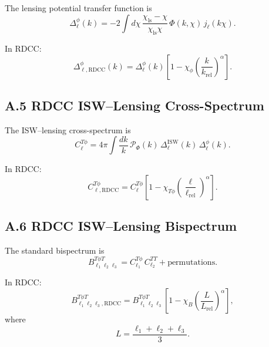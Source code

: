 \documentclass[11pt,a4paper]{article}
\begin{document}
The lensing potential transfer function is
\begin{equation}
    \Delta_{\ell}^{\phi}(k)
    = -2 \int d\chi\,
      \frac{\chi_{\mathrm{ls}}-\chi}{\chi_{\mathrm{ls}}\chi}\,
      \Phi(k,\chi)\,
      j_{\ell}(k\chi).
\end{equation}

In RDCC:
\begin{equation}
    \Delta_{\ell,\mathrm{RDCC}}^{\phi}(k)
    = \Delta_{\ell}^{\phi}(k)
      \left[
        1 - \chi_{\phi}
        \left(\frac{k}{k_{\mathrm{rel}}}\right)^{\alpha}
      \right].
\end{equation}

\subsection*{A.5 RDCC ISW–Lensing Cross-Spectrum}

The ISW–lensing cross-spectrum is
\begin{equation}
    C_{\ell}^{T\phi}
    = 4\pi \int \frac{dk}{k}\,
      \mathcal{P}_{\Phi}(k)\,
      \Delta_{\ell}^{\mathrm{ISW}}(k)\,
      \Delta_{\ell}^{\phi}(k).
\end{equation}

In RDCC:
\begin{equation}
    C_{\ell,\mathrm{RDCC}}^{T\phi}
    = C_{\ell}^{T\phi}
      \left[
        1 - \chi_{T\phi}
        \left(\frac{\ell}{\ell_{\mathrm{rel}}}\right)^{\alpha}
      \right].
\end{equation}

\subsection*{A.6 RDCC ISW–Lensing Bispectrum}

The standard bispectrum is
\begin{equation}
    B_{\ell_{1}\ell_{2}\ell_{3}}^{T\phi T}
    = C_{\ell_{1}}^{T\phi}\,C_{\ell_{2}}^{TT}
      + \text{permutations}.
\end{equation}

In RDCC:
\begin{equation}
    B_{\ell_{1}\ell_{2}\ell_{3},\mathrm{RDCC}}^{T\phi T}
    = B_{\ell_{1}\ell_{2}\ell_{3}}^{T\phi T}
      \left[
        1 - \chi_{B}
        \left(\frac{L}{L_{\mathrm{rel}}}\right)^{\alpha}
      \right],
\end{equation}
where
\begin{equation}
    L = \frac{\ell_{1}+\ell_{2}+\ell_{3}}{3}.
\end{equation}
\end{document}
